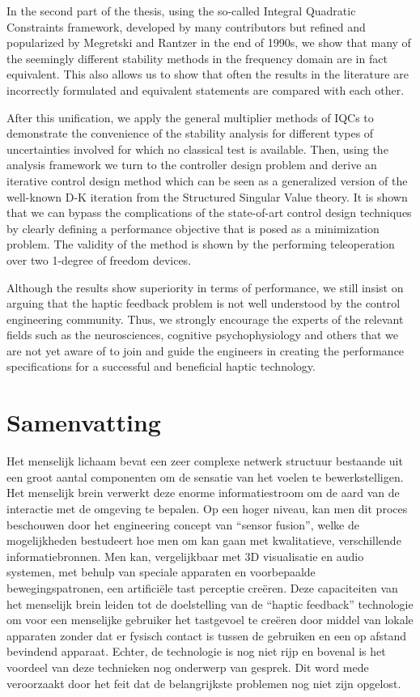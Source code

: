 In the second part of the thesis, using the so-called Integral Quadratic Constraints framework, developed by many contributors but 
refined and popularized by Megretski and Rantzer in the end of 1990s, we show that many of the seemingly different stability methods in 
the frequency domain are in fact equivalent. This also allows us to show that often the results in the literature are incorrectly 
formulated and equivalent statements are compared with each other. 

After this unification, we apply the general multiplier methods of IQCs to demonstrate the convenience of the stability analysis for 
different types of uncertainties involved for which no classical test is available. Then, using the analysis framework we turn to the 
controller design problem and derive an iterative control design method which can be seen as a generalized version of  the well-known D-K 
iteration from the Structured Singular Value theory. It is shown that we can bypass the complications of the state-of-art control design 
techniques by clearly defining a performance objective that is posed as a minimization problem. The validity of the method is shown by 
the performing teleoperation over two 1-degree of freedom devices. 

Although the results show superiority in terms of performance, we still insist on arguing that the haptic feedback problem is not well 
understood by the control engineering community. Thus, we strongly encourage the experts of the relevant fields such as the neurosciences, 
cognitive psychophysiology and others that we are not yet aware of to join and guide the engineers in creating the performance 
specifications for a successful and beneficial haptic technology.
\chapter{Samenvatting}

Het menselijk lichaam bevat een zeer complexe netwerk structuur bestaande uit een groot aantal componenten om de sensatie van het voelen 
te bewerkstelligen. Het menselijk brein verwerkt deze enorme informatiestroom om de aard van de interactie met de omgeving te bepalen. Op 
een hoger niveau, kan men dit proces beschouwen door het engineering concept van \enquote{sensor fusion}, welke de mogelijkheden bestudeert hoe men 
om kan gaan met kwalitatieve, verschillende informatiebronnen. Men kan, vergelijkbaar met 3D visualisatie en audio systemen, met behulp van 
speciale apparaten en voorbepaalde bewegingspatronen, een artificiële tast perceptie creëren. Deze capaciteiten van het menselijk brein 
leiden tot de doelstelling van de \enquote{haptic feedback} technologie om voor een menselijke gebruiker het tastgevoel te creëren door middel van 
lokale apparaten zonder dat er fysisch contact is tussen de gebruiken en een op afstand bevindend apparaat. Echter, de technologie is nog 
niet rijp en bovenal is het voordeel van deze technieken nog onderwerp van gesprek. Dit word mede veroorzaakt door het feit dat de 
belangrijkste problemen nog niet zijn opgelost.

